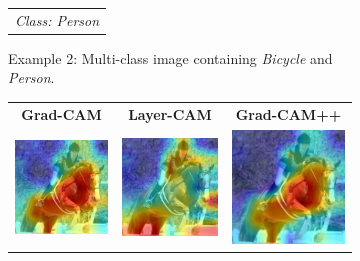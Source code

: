 \begin{figure}[!t]
{\begin{minipage}{0.9\textwidth}
\begin{subfigure}[t]{0.48\textwidth}
\begin{tabular}{c c c}
          \multicolumn{3}{c}{{\scriptsize \textit{Class: Person}}} \\
        \end{tabular}
        \caption{Example 2: Multi-class image containing \textit{Bicycle} and \textit{Person}.}
        \label{fig:cam_multiclass_b}
      \end{subfigure}
      
      \vspace{8pt}
      
      \begin{subfigure}[t]{0.48\textwidth}
        \centering
        \begin{tabular}{c c c}
          {\scriptsize \textbf{Grad-CAM}} & {\scriptsize \textbf{Layer-CAM}} & {\scriptsize \textbf{Grad-CAM++}} \\[2pt]
          \includegraphics[width=0.32\linewidth, height=0.32\linewidth]{figures/cams/gradcam/2008_002762_12} &
          \includegraphics[width=0.32\linewidth, height=0.32\linewidth]{figures/cams/layercam/2008_002762_12} &
          \includegraphics[width=0.32\linewidth, height=0.32\linewidth]{figures/cams/gradcampp/2008_002762_12} \\

\end{tabular}
\end{subfigure}
\end{minipage}}
\end{figure}
